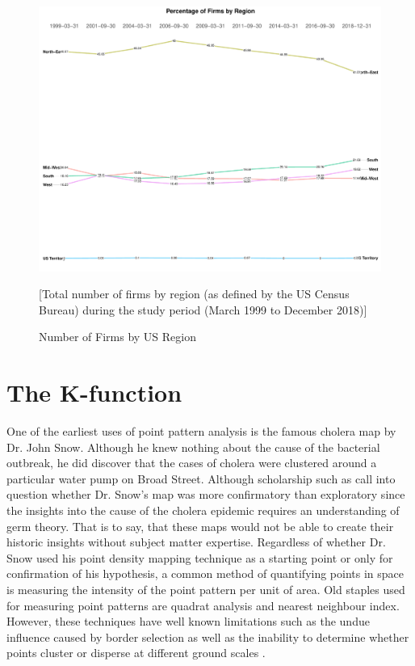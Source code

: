\begin{figure}
	\centering
	\includegraphics[width=1\linewidth]{Figures/ChapterIII/Percentage_firms_Region_USA}
	\caption{Number of Firms by US Region}[Total number of firms by region  (as defined by the US Census Bureau) during the study period (March 1999 to December 2018)]
	\label{fig:Percentage_firms_Region_USA}
\end{figure}



\section{The K-function} 
\label{kfunction}
One of the earliest uses of point pattern analysis is the famous cholera map by Dr. John Snow.  Although he knew nothing about the cause of the bacterial outbreak, he did discover that the cases of cholera were clustered around a particular water pump on Broad Street.  Although scholarship such as \cite{brody2000map} call into question whether Dr. Snow's map was more confirmatory than exploratory since the insights into the cause of the cholera epidemic requires an understanding of germ theory.  That is to say, that these maps would not be able to create their historic insights without subject matter expertise.  Regardless of whether Dr. Snow used his point density mapping technique as a starting point or only for confirmation of his hypothesis,  a common method of quantifying points in space is measuring the intensity of the point pattern per unit of area.  Old staples used for measuring point patterns are quadrat analysis and nearest neighbour index.  However, these techniques have well known limitations such as the undue influence caused by border selection as well as the inability to determine whether points cluster or disperse at different ground scales \citep{spatstatBook}.

